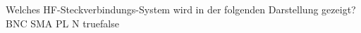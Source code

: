     {Welches HF-Steckverbindungs-System wird in der folgenden Darstellung gezeigt? }
    {BNC}
    {SMA}
    {PL}
    {N}
    {true}{false}